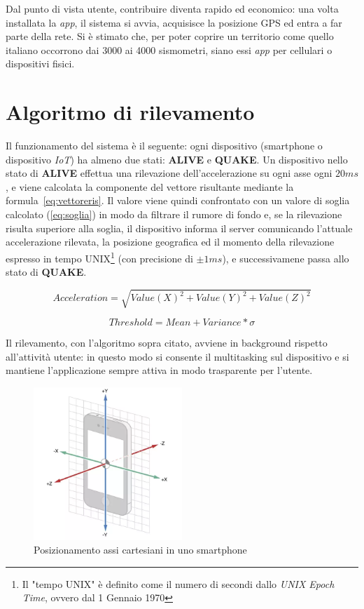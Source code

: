 \documentclass[a4paper,10pt]{memoir}
\begin{document}
Dal punto di vista utente, contribuire diventa rapido ed economico: una volta installata la \textit{app}, il sistema si avvia, acquisisce la posizione GPS ed entra a far parte della rete. Si è stimato che, per poter coprire un territorio come quello italiano occorrono dai 3000 ai 4000 sismometri, siano essi \textit{app} per cellulari o dispositivi fisici.

\section{Algoritmo di rilevamento}
\label{section:algoritmo}

Il funzionamento del sistema è il seguente: ogni dispositivo (smartphone o dispositivo \textit{IoT}) ha almeno due stati: \textbf{ALIVE} e \textbf{QUAKE}. Un dispositivo nello stato di \textbf{ALIVE} effettua una rilevazione dell'accelerazione su ogni asse ogni $20ms$, e viene calcolata la componente del vettore risultante mediante la formula~\ref{eq:vettoreris}. Il valore viene quindi confrontato con un valore di soglia calcolato (\ref{eq:soglia}) in modo da filtrare il rumore di fondo e, se la rilevazione risulta superiore alla soglia, il dispositivo informa il server comunicando l'attuale accelerazione rilevata, la posizione geografica ed il momento della rilevazione espresso in tempo UNIX\footnote{Il "tempo UNIX" è definito come il numero di secondi dallo \textit{UNIX Epoch Time}, ovvero dal 1 Gennaio 1970} (con precisione di $\pm1ms$), e successivamene passa allo stato di \textbf{QUAKE}.

\begin{equation} \label{eq:vettoreris}
Acceleration = \sqrt{Value(X)^2 + Value(Y)^2 + Value(Z)^2}
\end{equation}

\begin{equation} \label{eq:soglia}
Threshold = Mean + Variance * \sigma
\end{equation}

Il rilevamento, con l'algoritmo sopra citato, avviene in background rispetto all'attività utente: in questo modo si consente il multitasking sul dispositivo e si mantiene l'applicazione sempre attiva in modo trasparente per l'utente.

\begin{figure}[ht]
\centering
\caption{Posizionamento assi cartesiani in uno smartphone}
\label{fig:scsaxes}
\includegraphics[width=0.5\textwidth]{introduzione/smartphone_axes}
\end{figure}
\end{document}
